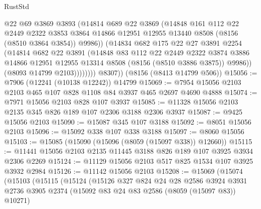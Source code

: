 \begin{lexlean}{RustStd}
\begin{coremodule}
                    @22
                    @69
                    @3869
                    @3893
                    (@14814
                      @689
                      @22
                      @3869
                      (@14848
                        @161
                        @112
                        @22
                        @2449
                        @2322
                        @3853
                        @3864
                        @14866
                        @12951
                        @12955
                        @13440
                        @8508
                        (@8156 (@8510 @3864 @3854))
                        @9986))
                    (@14834
                      @682
                      @175
                      @22
                      @27
                      @3891
                      @2254
                      (@14814
                        @682
                        @22
                        @3891
                        (@14848
                          @83
                          @112
                          @22
                          @2449
                          @2322
                          @3874
                          @3886
                          @14866
                          @12951
                          @12955
                          @13314
                          @8508
                          (@8156 (@8510 @3886 @3875))
                          @9986))
                      (@8093 @14799 @2103))))))))
        @8307))
    (@8156 (@8413 @14799 @506))
@15056 := @7906 (@12241 (@10138 @12242)) @14799
@15069 := @7954 @15056 @2103 @2103 @465 @107 @828 @1108 @84 @3937 @465 @2697 @4690 @4888
@15074 := @7971 @15056 @2103 @828 @107 @3937
@15085 := @11328 @15056 @2103 @2135 @345 @826 @189 @107 @2306 @3188 @2306 @3937
@15087 := @9425 @15056 @2103
@15090 := @15087 @345 @107 @3188
@15092 := @8051 @15056 @2103
@15096 := @15092 @338 @107 @338 @3188
@15097 := @8060 @15056
@15103 := @15085 (@15090 (@15096 (@8059 (@15097 @338)) @12660))
@15115 := @11441 @15056 @2103 @2135 @11445 @3188 @826 @189 @107 @3925 @3934 @2306 @2269
@15124 := @11129 @15056 @2103 @517 @825 @1534 @107 @3925 @3932 @2984
@15126 := @11142 @15056 @2103
@15208 := @15069
    (@15074
      (@15103
        (@15115
          (@15124
            (@15126
              @327
              @824
              @24
              @28
              @2586
              @3924
              @3931
              @2736
              @3905
              @2374
              (@15092 @83 @24 @83 @2586 (@8059 (@15097 @83)) @10271)

\end{coremodule}
\end{lexlean}
